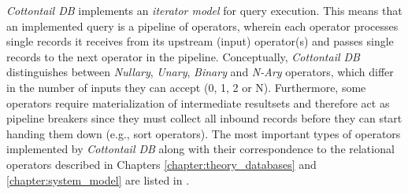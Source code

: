 \emph{Cottontail DB} implements an \emph{iterator model} for query execution. This means that an implemented query is a pipeline of operators, wherein each operator processes single records it receives from its upstream (input) operator(s) and passes single records to the next operator in the pipeline. Conceptually, \emph{Cottontail DB} distinguishes between \emph{Nullary}, \emph{Unary}, \emph{Binary} and \emph{N-Ary} operators, which differ in the number of inputs they can accept (0, 1, 2 or N). Furthermore, some operators require materialization of intermediate resultsets and therefore act as pipeline breakers since they must collect all inbound records before they can start handing them down (e.g., sort operators). The most important types of operators implemented by \emph{Cottontail DB} along with their correspondence to the relational operators described in Chapters \ref{chapter:theory_databases} and \ref{chapter:system_model} are listed in .

